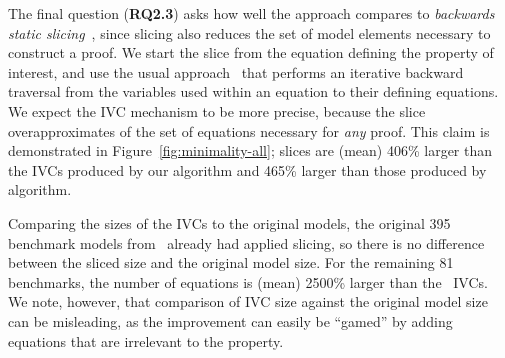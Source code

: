 The final question (\textbf{RQ2.3}) asks how well the approach compares to {\em backwards static slicing}~\cite{Tip95asurvey}, since slicing also reduces the set of model elements necessary to construct a proof.  We start the slice from the equation defining the property of interest, and use the usual approach~\cite{Gaucher03:slicing} that performs an iterative backward traversal from the variables used within an equation to their defining equations.  We expect the IVC mechanism to be more precise, because the slice overapproximates of the set of equations necessary for {\em any} proof.  This claim is demonstrated in Figure~\ref{fig:minimality-all}; slices are (mean) 406\% larger than the IVCs produced by our \ucalg algorithm and 465\% larger than those produced by \ucbfalg algorithm.


Comparing the sizes of the \ucalg IVCs to the original models, the original 395 benchmark models from~\cite{Hagen08:FMCAD} already had applied slicing, so there is no difference between the sliced size and the original model size.  For the remaining 81 benchmarks, the number of equations is (mean) 2500\% larger than the \ucalg\ IVCs.  We note, however, that comparison of IVC size against the original model size can be misleading, as the improvement can easily be ``gamed'' by adding equations that are irrelevant to the property. %




